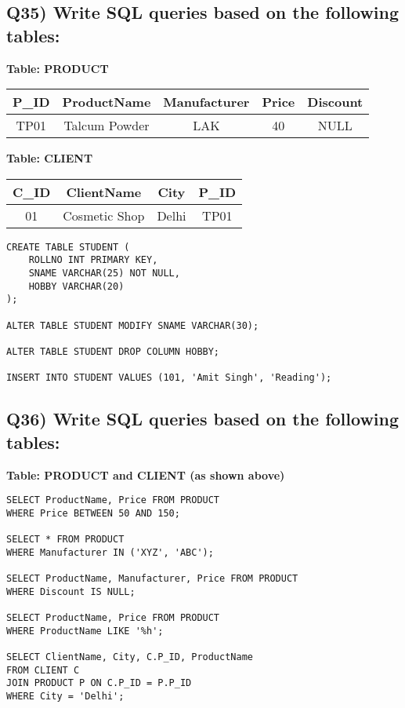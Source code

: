 \documentclass{article}
\begin{document}
\subsection*{Q35) Write SQL queries based on the following tables:}

\textbf{Table: PRODUCT}
\begin{center}
\begin{tabular}{|c|c|c|c|c|}
\hline
P\_ID & ProductName & Manufacturer & Price & Discount \\
\hline
TP01 & Talcum Powder & LAK & 40 & NULL \\
\hline
\end{tabular}
\end{center}

\textbf{Table: CLIENT}
\begin{center}
\begin{tabular}{|c|c|c|c|}
\hline
C\_ID & ClientName & City & P\_ID \\
\hline
01 & Cosmetic Shop & Delhi & TP01 \\
\hline
\end{tabular}
\end{center}

\begin{lstlisting}
CREATE TABLE STUDENT (
    ROLLNO INT PRIMARY KEY,
    SNAME VARCHAR(25) NOT NULL,
    HOBBY VARCHAR(20)
);

ALTER TABLE STUDENT MODIFY SNAME VARCHAR(30);

ALTER TABLE STUDENT DROP COLUMN HOBBY;

INSERT INTO STUDENT VALUES (101, 'Amit Singh', 'Reading');
\end{lstlisting}

\subsection*{Q36) Write SQL queries based on the following tables:}

\textbf{Table: PRODUCT and CLIENT (as shown above)}

\begin{lstlisting}
SELECT ProductName, Price FROM PRODUCT 
WHERE Price BETWEEN 50 AND 150;

SELECT * FROM PRODUCT 
WHERE Manufacturer IN ('XYZ', 'ABC');

SELECT ProductName, Manufacturer, Price FROM PRODUCT 
WHERE Discount IS NULL;

SELECT ProductName, Price FROM PRODUCT 
WHERE ProductName LIKE '%h';

SELECT ClientName, City, C.P_ID, ProductName 
FROM CLIENT C 
JOIN PRODUCT P ON C.P_ID = P.P_ID 
WHERE City = 'Delhi';
\end{lstlisting}
\end{document}
